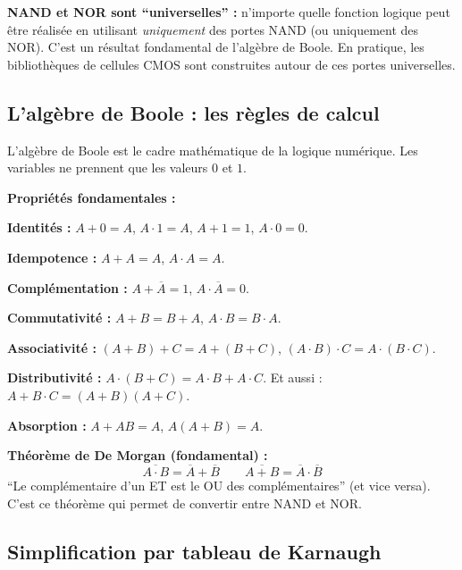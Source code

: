 \documentclass[12pt,a4paper,twoside]{book}
\begin{document}
\begin{attention}
\textbf{NAND et NOR sont ``universelles'' :} n'importe quelle fonction logique peut être réalisée en utilisant \textit{uniquement} des portes NAND (ou uniquement des NOR). C'est un résultat fondamental de l'algèbre de Boole. En pratique, les bibliothèques de cellules CMOS sont construites autour de ces portes universelles.
\end{attention}

\subsection{L'algèbre de Boole : les règles de calcul}

L'algèbre de Boole est le cadre mathématique de la logique numérique. Les variables ne prennent que les valeurs $0$ et $1$.

\begin{formule}
\textbf{Propriétés fondamentales :}

\textbf{Identités :} $A + 0 = A$, $A \cdot 1 = A$, $A + 1 = 1$, $A \cdot 0 = 0$.

\textbf{Idempotence :} $A + A = A$, $A \cdot A = A$.

\textbf{Complémentation :} $A + \overline{A} = 1$, $A \cdot \overline{A} = 0$.

\textbf{Commutativité :} $A+B = B+A$, $A \cdot B = B \cdot A$.

\textbf{Associativité :} $(A+B)+C = A+(B+C)$, $(A \cdot B) \cdot C = A \cdot (B \cdot C)$.

\textbf{Distributivité :} $A \cdot (B+C) = A \cdot B + A \cdot C$. Et aussi : $A + B \cdot C = (A+B)(A+C)$.

\textbf{Absorption :} $A + AB = A$, $A(A+B) = A$.

\textbf{Théorème de De Morgan (fondamental) :}
\[
\boxed{\overline{A \cdot B} = \overline{A} + \overline{B}} \qquad \boxed{\overline{A + B} = \overline{A} \cdot \overline{B}}
\]
``Le complémentaire d'un ET est le OU des complémentaires'' (et vice versa). C'est ce théorème qui permet de convertir entre NAND et NOR.
\end{formule}

\subsection{Simplification par tableau de Karnaugh}
\end{document}

